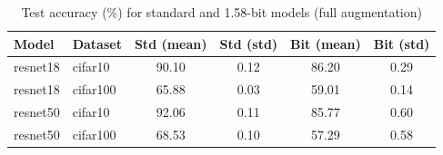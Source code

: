 \begin{table}[h]
\centering
\caption{Test accuracy (\%) for standard and 1.58-bit models (full augmentation)}
\label{tab:accuracy_full}
\begin{tabular}{llcccc}
\toprule
Model & Dataset & Std (mean) & Std (std) & Bit (mean) & Bit (std) \\
\midrule
resnet18 & cifar10 & 90.10 & 0.12 & 86.20 & 0.29 \\
resnet18 & cifar100 & 65.88 & 0.03 & 59.01 & 0.14 \\
resnet50 & cifar10 & 92.06 & 0.11 & 85.77 & 0.60 \\
resnet50 & cifar100 & 68.53 & 0.10 & 57.29 & 0.58 \\
\bottomrule
\end{tabular}
\end{table}